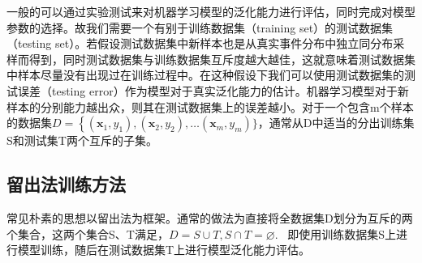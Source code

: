  \indent 一般的可以通过实验测试来对机器学习模型的泛化能力进行评估，同时完成对模型参数的选择。故我们需要一个有别于训练数据集（training set）的测试数据集（testing set）。若假设测试数据集中新样本也是从真实事件分布中独立同分布采样而得到，同时测试数据集与训练数据集互斥度越大越佳，这就意味着测试数据集中样本尽量没有出现过在训练过程中。在这种假设下我们可以使用测试数据集的测试误差（testing error）作为模型对于真实泛化能力的估计。机器学习模型对于新样本的分别能力越出众，则其在测试数据集上的误差越小。对于一个包含m个样本的数据集$D=\left\{\left(\boldsymbol{x}_{1}, y_{1}\right),\left(\boldsymbol{x}_{2}, y_{2}\right), \ldots\right.\left(\boldsymbol{x}_{m}, y_{m}\right) \}$，通常从D中适当的分出训练集S和测试集T两个互斥的子集。
 
 \subsection{留出法训练方法}
 \indent 常见朴素的思想以留出法为框架。通常的做法为直接将全数据集D划分为互斥的两个集合，这两个集合S、T满足，$D=S \cup T, S \cap T=\varnothing$. ~即使用训练数据集S上进行模型训练，随后在测试数据集T上进行模型泛化能力评估。
